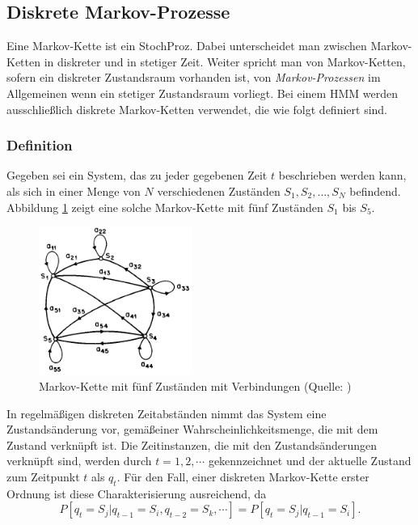 \subsection{Diskrete Markov-Prozesse}
\label{subsec:MarkovKette}
Eine Markov-Kette ist ein \gls{StochProz}. Dabei unterscheidet man zwischen Markov-Ketten in diskreter und in stetiger Zeit. Weiter spricht man von Markov-Ketten, sofern ein diskreter Zustandsraum vorhanden ist, von \textit{Markov-Prozessen} im Allgemeinen wenn ein stetiger Zustandsraum vorliegt.
\newline
Bei einem \acrshort{HMM} werden ausschlie\ss lich diskrete Markov-Ketten verwendet, die wie folgt definiert sind.

\subsubsection{Definition}
Gegeben sei ein System, das zu jeder gegebenen Zeit $t$ beschrieben werden kann, als sich in einer Menge von $N$ verschiedenen Zust\"anden
$S_1, S_2, \ldots, S_N$ befindend. Abbildung \ref{fig:MarkovKette} zeigt eine solche Markov-Kette mit f\"unf Zust\"anden $S_1$ bis $S_5$.
\begin{figure}[htb]
\centering
\includegraphics[width=5cm]{img/markov/markov_chain.png}
\caption[Markov-Kette mit f\"unf Zust\"anden]{Markov-Kette mit f\"unf Zust\"anden  mit Verbindungen (Quelle: )}
\label{fig:MarkovKette}
\end{figure}
In regelm\"a\ss igen diskreten Zeitabst\"anden nimmt das System eine Zustands\"anderung vor, gem\"a\ss einer Wahrscheinlichkeitsmenge, die mit dem Zustand verkn\"upft ist. Die Zeitinstanzen, die mit den Zustands\"anderungen verkn\"upft sind, werden durch $t = 1, 2, \cdots$ gekennzeichnet und der aktuelle Zustand zum Zeitpunkt $t$ als $q_t$. F\"ur den Fall, einer diskreten Markov-Kette erster Ordnung ist diese Charakterisierung ausreichend, da
\begin{equation}
\label{E:PropMarkov}
P[q_t = S_j | q_{t-1} = S_i, q_{t-2} = S_k, \cdots]= P[q_t = S_j | q_{t-1} = S_i].
\end{equation}
